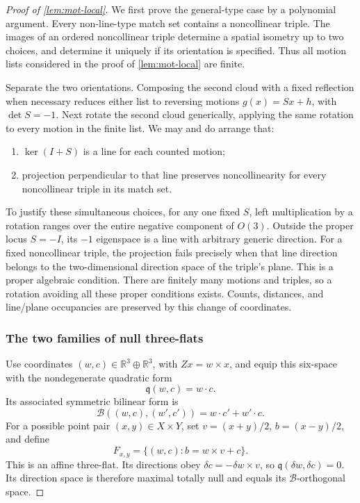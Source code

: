 \begin{proof}[Proof of \cref{lem:mot-local}]
We first prove the general-type case by a polynomial argument. Every non-line-type match set contains a noncollinear triple. The images of an ordered noncollinear triple determine a spatial isometry up to two choices, and determine it uniquely if its orientation is specified.  Thus all motion lists considered in the proof of \cref{lem:mot-local} are finite.

Separate the two orientations.  Composing the second cloud with a fixed reflection when necessary reduces either list to reversing motions $g(x)=Sx+h$, with $\det S=-1$.  Next rotate the second cloud generically, applying the same rotation to every motion in the finite list.  We may and do arrange that:
\begin{enumerate}
\item $\ker(I+S)$ is a line for each counted motion;
\item projection perpendicular to that line preserves
noncollinearity for every noncollinear triple in its match set.
\end{enumerate}
To justify these simultaneous choices, for any one fixed $S$, left multiplication by a rotation ranges over the entire negative component of $O(3)$.  Outside the proper locus $S=-I$, its $-1$ eigenspace is a line with arbitrary generic direction. For a fixed noncollinear triple, the projection fails precisely when that line direction belongs to the two-dimensional direction space of the triple's plane.  This is a proper algebraic condition. There are finitely many motions and triples, so a rotation avoiding all these proper conditions exists.  Counts, distances, and line/plane occupancies are preserved by this change of coordinates.

\subsubsection{The two families of null three-flats}

Use coordinates $(w,c)\in\mathbb{R}^3\oplus\mathbb{R}^3$, with $Zx=w\times x$, and equip this six-space with the nondegenerate quadratic form
\[
 \mathfrak{q}(w,c)=w\cdot c.
\]
Its associated symmetric bilinear form is
\[
 \mathcal{B}((w,c),(w',c'))=w\cdot c'+w'\cdot c.
\]
For a possible point pair $(x,y)\in X\times Y$, set $v=(x+y)/2$, $b=(x-y)/2$, and define
\begin{equation}
\label{eq:mot-pair-flat}
 F_{x,y}=\{(w,c):b=w\times v+c\}.
\end{equation}
This is an affine three-flat.  Its directions obey $\delta c=-\delta w\times v$, so $\mathfrak{q}(\delta w,\delta c)=0$.  Its direction space is therefore maximal totally null and equals its $\mathcal{B}$-orthogonal space.


\end{proof}
